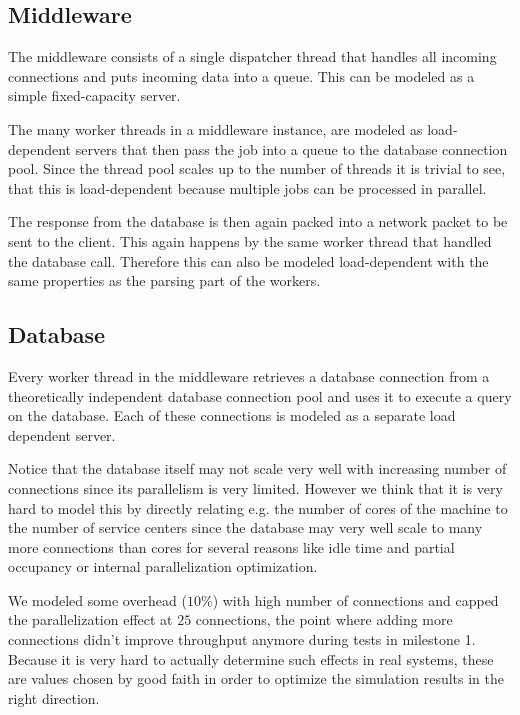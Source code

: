 \documentclass[a4paper, oneside]{csthesis}
\begin{document}
\subsection{Middleware}
    The middleware consists of a single dispatcher thread that handles all
    incoming connections and puts incoming data into a queue. This can be
    modeled as a simple fixed-capacity server.
    
    The many worker threads in a \telesto{} middleware instance, are modeled as
    load-dependent servers that then pass the job into a queue to the database
    connection pool. Since the thread pool scales up to the number of threads it
    is trivial to see, that this is load-dependent because multiple jobs can be
    processed in parallel.
    
    The response from the database is then again packed into a \telesto{}
    network packet to be sent to the client. This again happens by the same
    worker thread that handled the database call. Therefore this can also be
    modeled load-dependent with the same properties as the parsing part of the
    workers.
    
\subsection{Database}
    Every worker thread in the middleware retrieves a database connection from
    a theoretically independent database connection pool and uses it to execute
    a query on the database. Each of these connections is modeled as a separate
    load dependent server.
    
    Notice that the database itself may not scale very well with increasing
    number of connections since its parallelism is very limited. However we
    think that it is very hard to model this by directly relating e.g. the
    number of cores of the machine to the number of service centers since the
    database may very well scale to many more connections than cores for several
    reasons like idle time and partial occupancy or internal parallelization
    optimization. 
    
    We modeled some overhead ($10\%$) with high number of connections and capped
    the parallelization effect at $25$ connections, the point where adding more
    connections didn't improve throughput anymore during tests in milestone 1.
    Because it is very hard to actually determine such effects in real systems,
    these are values chosen by good faith in order to optimize the simulation
    results in the right direction.
    
\end{document}
